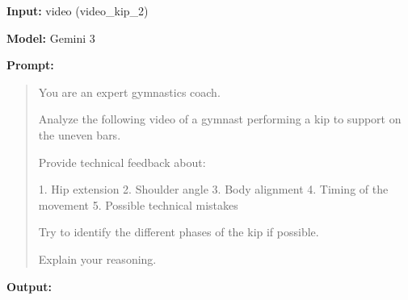\textbf{Input:} video (video\_kip\_2)

\textbf{Model:} Gemini 3

\textbf{Prompt:}

\begin{quote}
You are an expert gymnastics coach.

Analyze the following video of a gymnast performing a kip to support
on the uneven bars.

Provide technical feedback about:

1. Hip extension
2. Shoulder angle
3. Body alignment
4. Timing of the movement
5. Possible technical mistakes

Try to identify the different phases of the kip if possible.

Explain your reasoning.
\end{quote}

\textbf{Output:}

